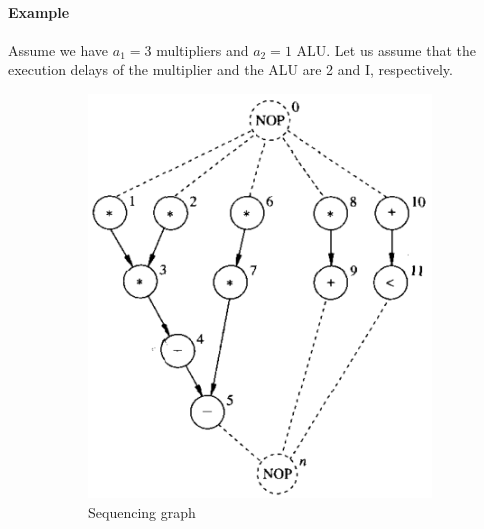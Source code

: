 \paragraph{Example}
Assume we have $ a_1=3 $ multipliers and  $ a_2=1 $  ALU. Let us assume that the execution delays of the multiplier and the ALU are  2  and  I,  respectively.
\begin{figure}[H]
    \centering
    \begin{subfigure}[b]{0.35\textwidth}
        \includegraphics[width=\textwidth]{./Cap4/Images/Image01.png}
        \caption{Sequencing  graph}
   		\label{fig:Seqgraph2}
    \end{subfigure}
    \quad\quad\quad
    \begin{subfigure}[b]{0.35\textwidth}

\end{subfigure}
\end{figure}
